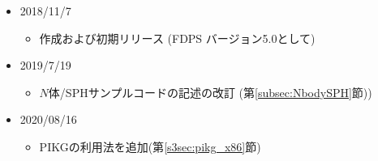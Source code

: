 \begin{itemize}
\item 2018/11/7
  \begin{itemize}
  \item 作成および初期リリース (FDPS バージョン5.0として)
  \end{itemize}
\item 2019/7/19
  \begin{itemize}
  \item $N$体/SPHサンプルコードの記述の改訂 (第\ref{subsec:NbodySPH}節))
  \end{itemize}
\item 2020/08/16
  \begin{itemize}
  \item PIKGの利用法を追加(第\ref{s3sec:pikg_x86}節)
  \end{itemize}
  
\end{itemize}

